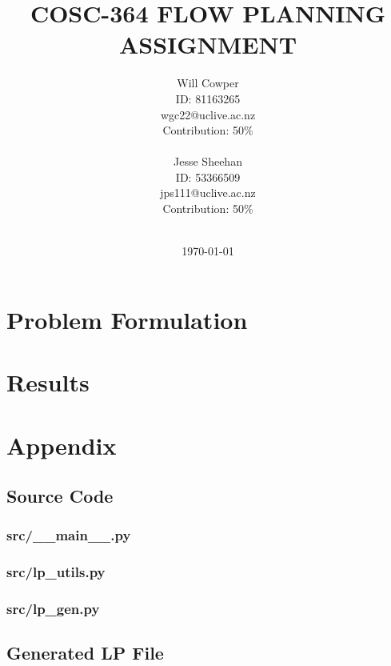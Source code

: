 \documentclass[12pt]{article} %
\title{\uppercase{
	COSC-364 Flow Planning Assignment
}}
\date{\today}
\author{
	Will Cowper\\
	{\small{ID: 81163265}}\\
	{\small{wgc22@uclive.ac.nz}}\\
	{\small{Contribution: 50\%}}\\
	\\
	Jesse Sheehan\\
	{\small{ID: 53366509}}\\
	{\small{jps111@uclive.ac.nz}}\\
	{\small{Contribution: 50\%}}\\
	\\
}
\begin{document}
\maketitle

\newpage

\section{Problem Formulation}


\section{Results}


\section{Appendix}


\subsection{Source Code}

\subsubsection{src/\_\_main\_\_.py}


\subsubsection{src/lp\_utils.py}


\subsubsection{src/lp\_gen.py}



\subsection{Generated LP File}
\end{document}
